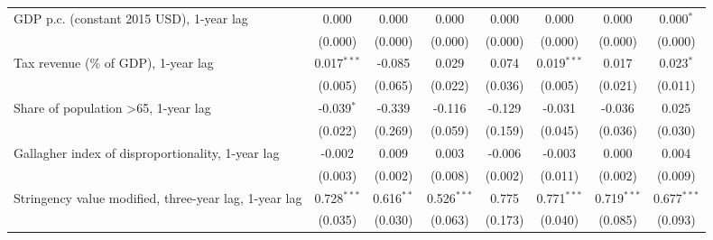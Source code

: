\begin{table}[htbp]
\begin{tabular}{lccccccc}
      GDP p.c. (constant 2015 USD), 1-year lag                                                 & 0.000          & 0.000                     & 0.000          & 0.000            & 0.000           & 0.000           & 0.000$^{*}$\\   
                                                                                               & (0.000)        & (0.000)                   & (0.000)        & (0.000)          & (0.000)         & (0.000)         & (0.000)\\   
      Tax revenue (\% of GDP), 1-year lag                                                      & 0.017$^{***}$  & -0.085                    & 0.029          & 0.074            & 0.019$^{***}$   & 0.017           & 0.023$^{*}$\\   
                                                                                               & (0.005)        & (0.065)                   & (0.022)        & (0.036)          & (0.005)         & (0.021)         & (0.011)\\   
      Share of population >65, 1-year lag                                                      & -0.039$^{*}$   & -0.339                    & -0.116         & -0.129           & -0.031          & -0.036          & 0.025\\   
                                                                                               & (0.022)        & (0.269)                   & (0.059)        & (0.159)          & (0.045)         & (0.036)         & (0.030)\\   
      Gallagher index of disproportionality, 1-year lag                                        & -0.002         & 0.009                     & 0.003          & -0.006           & -0.003          & 0.000           & 0.004\\   
                                                                                               & (0.003)        & (0.002)                   & (0.008)        & (0.002)          & (0.011)         & (0.002)         & (0.009)\\   
      Stringency value modified, three-year lag, 1-year lag                                    & 0.728$^{***}$  & 0.616$^{**}$              & 0.526$^{***}$  & 0.775            & 0.771$^{***}$   & 0.719$^{***}$   & 0.677$^{***}$\\   
                                                                                               & (0.035)        & (0.030)                   & (0.063)        & (0.173)          & (0.040)         & (0.085)         & (0.093)\\   

\end{tabular}
\end{table}
